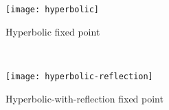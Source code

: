 \begin{figure}[ht]
  \centering
  \begin{subfigure}[t]{0.45\textwidth}
    \centering
    \texttt{[image: hyperbolic]}
    \caption{Hyperbolic fixed point}
  \end{subfigure}
~
  \begin{subfigure}[t]{0.45\textwidth}
    \centering
    \texttt{[image: hyperbolic-reflection]}
    \caption{Hyperbolic-with-reflection fixed point}
  \end{subfigure}
\caption{}
\label{fig:hyperbolic}
\end{figure}



